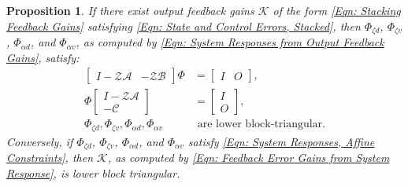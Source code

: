 \documentclass[letterpaper, 10 pt, conference]{ieeeconf}
\newcommand{\A}{\mathcal{A}}
\newcommand{\B}{\mathcal{B}}
\newcommand{\C}{\mathcal{C}}
\newcommand{\K}{\mathcal{K}}
\newcommand{\Z}{\mathcal{Z}}
\newcommand{\?}{\stackrel{?}{=}}
\newcommand{\disturbance}{d}
\newcommand{\ratePGD}{\alpha}
\newcommand{\feedbackGainStacked}{\K}
\newcommand{\downshift}{\Z}
\newcommand{\systemResponse}{\Phi}
\newcommand{\jacobianStateStacked}{\A}
\newcommand{\outputMatrixStacked}{\C}
\newcommand{\state}{\zeta}
\newcommand{\outputNoise}{v}
\newtheorem{proposition}{Proposition}
\newcommand{\frank}[1]{{\textcolor[rgb]{0,0,1}{\textsf{[Frank: {#1}]}}}}
\newcommand{\antoine}[1]{{\textcolor[rgb]{1,0,0}{\textsf{[Antoine: {#1}]}}}}
\begin{document}
\begin{proposition}\cite[Prop. 1]{ZhouTzoumas2023SafeControlofPartiallyObservedLTVSystems}
If there exist output feedback gains $\feedbackGainStacked$ of the form \eqref{Eqn: Stacking Feedback Gains} satisfying \eqref{Eqn: State and Control Errors, Stacked}, then $\systemResponse_{\state \disturbance}$, $ \systemResponse_{\state \outputNoise}$, $ \systemResponse_{\ratePGD \disturbance}$, and $\systemResponse_{\ratePGD \outputNoise}$, as computed by \eqref{Eqn: System Responses from Output Feedback Gains},
satisfy: 
{
\setlength{\abovedisplayskip}{3.5pt}
\setlength{\belowdisplayskip}{3.5pt}
\begin{subequations} \label{Eqn: System Responses, Affine Constraints}
\begin{align} \label{Eqn: System Responses, Affine Constraints, Controllability}
    \begin{bmatrix}
        I - \downshift \A & - \downshift \B
    \end{bmatrix} \systemResponse &= 
    \begin{bmatrix}
        I & O
    \end{bmatrix}, \\ \label{Eqn: System Responses, Affine Constraints, Observability}
    \systemResponse \begin{bmatrix}
        I - \downshift \jacobianStateStacked \\ -\outputMatrixStacked
    \end{bmatrix} &= 
    \begin{bmatrix}
        I \\ O
    \end{bmatrix}, \\ \label{Eqn: System Responses, Affine Constraints, Upper Triangular}
    \systemResponse_{\state \disturbance}, \systemResponse_{\state \outputNoise}, \systemResponse_{\ratePGD \disturbance}, \systemResponse_{\ratePGD \outputNoise} &\text{ are lower block-triangular}.
\end{align}
\end{subequations}
}
\hspace{-1mm}Conversely, if $\systemResponse_{\state \disturbance}$, $ \systemResponse_{\state \outputNoise}$, $ \systemResponse_{\ratePGD \disturbance}$, and $\systemResponse_{\ratePGD \outputNoise}$ 
satisfy \eqref{Eqn: System Responses, Affine Constraints}, then $\feedbackGainStacked$, as computed by \eqref{Eqn: Feedback Error Gains from System Response}, is lower block triangular.
\end{proposition}
\end{document}

